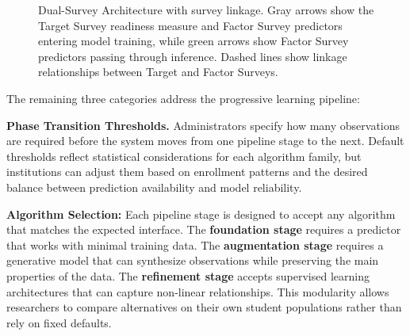 \documentclass[letterpaper,11pt]{article}
\begin{document}
\begin{figure}[htbp]
{
}%
\caption{Dual-Survey Architecture with survey linkage. Gray arrows show the Target Survey readiness measure and Factor Survey predictors entering model training, while green arrows show Factor Survey predictors passing through inference. Dashed lines show linkage relationships between Target and Factor Surveys.}
\label{fig:linkage}
\end{figure}

The remaining three categories address the progressive learning pipeline:

\textbf{Phase Transition Thresholds.} Administrators specify how many observations are required before the system moves from one pipeline stage to the next. Default thresholds reflect statistical considerations for each algorithm family, but institutions can adjust them based on enrollment patterns and the desired balance between prediction availability and model reliability.

\textbf{Algorithm Selection:} Each pipeline stage is designed to accept any algorithm that matches the expected interface. The \textbf{foundation stage} requires a predictor that works with minimal training data. The \textbf{augmentation stage} requires a generative model that can synthesize observations while preserving the main properties of the data. The \textbf{refinement stage} accepts supervised learning architectures that can capture non-linear relationships. This modularity allows researchers to compare alternatives on their own student populations rather than rely on fixed defaults.
\end{document}
